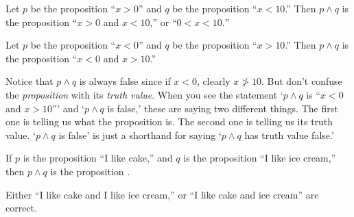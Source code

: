 \begin{exa}
Let $p$ be the proposition ``$x>0$'' and $q$ be the proposition ``$x<10$.''
Then $p\wedge q$ is the proposition ``$x>0$ and $x<10$,'' or ``$0<x<10.$''
\end{exa}


\vspace*{-.1in} %

\begin{exa}
Let $p$ be the proposition ``$x<0$'' and $q$ be the proposition ``$x>10$.''
Then $p\wedge q$ is the proposition ``$x<0$ and $x>10$.''

Notice that $p\wedge q$ is always false since if $x<0$, clearly $x\not>10$.
But don't confuse the {\em proposition} with its {\em truth value}.
When you see the statement `$p\wedge q$ is ``$x<0$ and $x>10$'''
and `$p\wedge q$ is false,' these are saying two different things.
The first one is telling us what the proposition is.  
The second one is telling us its truth value.  
`$p\wedge q$ is false' is just a shorthand for saying `$p\wedge q$ has truth value false.'
\end{exa}

\vspace*{-.1in} %

\begin{fib}
If $p$ is the proposition ``I like cake,'' and $q$ is the proposition ``I like ice cream,''
then $p\wedge q$ is the proposition \blanklinefill.
\begin{answer}
Either 
``I like cake and I like ice cream,'' or
``I like cake and ice cream'' are correct.
\end{answer}
\end{fib}


